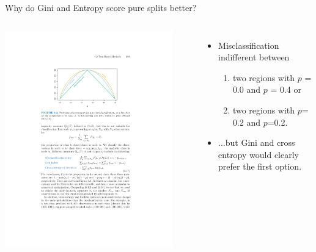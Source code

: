 \documentclass[mathserif, aspectratio=169]{beamer}
\begin{document}
\begin{frame}{Why do Gini and Entropy score pure splits better?}

\begin{columns}
\includegraphics[width=0.9\textwidth]{E_vs_G_vs_D}



\begin{itemize}
\item Misclassification indifferent between 
\begin{enumerate}
\item two regions with $p$ = 0.0 and $p$ = 0.4 or
\item two regions with $p$= 0.2 and $p$=0.2.
\end{enumerate}
\item ...but Gini and cross entropy would clearly prefer the first option.  
\end{itemize}
\end{columns}


\end{frame}
\end{document}
